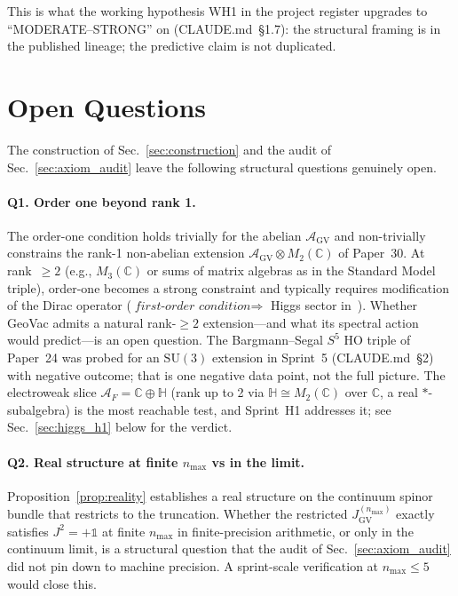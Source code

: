 \documentclass[11pt]{article}
\begin{document}
This is what the working hypothesis WH1 in the project register
upgrades to ``MODERATE--STRONG'' on (CLAUDE.md~\S 1.7): the structural
framing is in the published lineage; the predictive claim is not
duplicated.

\section{Open Questions}
\label{sec:open}

The construction of Sec.~\ref{sec:construction} and the audit of
Sec.~\ref{sec:axiom_audit} leave the following structural questions
genuinely open.

\paragraph{Q1.  Order one beyond rank 1.}  The order-one condition
holds trivially for the abelian $\mathcal{A}_{\mathrm{GV}}$ and
non-trivially constrains the rank-1 non-abelian extension
$\mathcal{A}_{\mathrm{GV}} \otimes M_2(\mathbb{C})$ of Paper~30.  At
rank~$\ge 2$ (e.g., $M_3(\mathbb{C})$ or sums of matrix algebras as in
the Standard Model triple), order-one becomes a strong constraint and
typically requires modification of the Dirac operator
($\textit{first-order condition} \Rightarrow$ Higgs sector
in~\cite{chamseddine_connes2010}).  Whether GeoVac admits a natural
rank-$\ge 2$ extension---and what its spectral action would predict---is
an open question.  The Bargmann--Segal $S^5$ HO triple of
Paper~24 was probed for an $\mathrm{SU}(3)$ extension in
Sprint~5 (CLAUDE.md~\S 2) with negative outcome; that is one negative
data point, not the full picture.  The electroweak slice
$\mathcal{A}_F = \mathbb{C} \oplus \mathbb{H}$ (rank up to 2 via
$\mathbb{H} \cong M_2(\mathbb{C})$ over $\mathbb{C}$, a real
$*$-subalgebra) is the most reachable test, and Sprint~H1
addresses it; see Sec.~\ref{sec:higgs_h1} below for the verdict.

\paragraph{Q2.  Real structure at finite $n_{\max}$ vs in the limit.}
Proposition~\ref{prop:reality} establishes a real structure on the
continuum spinor bundle that restricts to the truncation.  Whether the
restricted $J_{\mathrm{GV}}^{(n_{\max})}$ exactly satisfies $J^2 =
+\mathbb{1}$ at finite $n_{\max}$ in finite-precision arithmetic, or
only in the continuum limit, is a structural question that the audit
of Sec.~\ref{sec:axiom_audit} did not pin down to machine precision.
A sprint-scale verification at $n_{\max} \le 5$ would close this.
\end{document}
